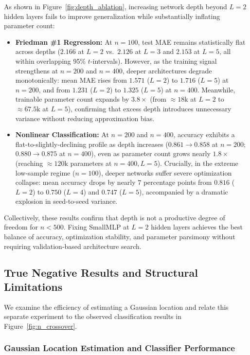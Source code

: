 \documentclass{article}
\begin{document}
As shown in Figure~\ref{fig:depth_ablation}, increasing network depth beyond $L=2$ hidden layers fails to improve generalization while substantially inflating parameter count:
\begin{itemize}
    \item \textbf{Friedman \#1 Regression:} At $n=100$, test MAE remains statistically flat across depths ($2.166$ at $L=2$ vs.\ $2.126$ at $L=3$ and $2.153$ at $L=5$, all within overlapping 95\% $t$-intervals). However, as the training signal strengthens at $n=200$ and $n=400$, deeper architectures degrade monotonically: mean MAE rises from $1.571$ ($L=2$) to $1.716$ ($L=5$) at $n=200$, and from $1.231$ ($L=2$) to $1.325$ ($L=5$) at $n=400$. Meanwhile, trainable parameter count expands by $3.8\times$ (from $\approx 18\text{k}$ at $L=2$ to $\approx 67.5\text{k}$ at $L=5$), confirming that excess depth introduces unnecessary variance without reducing approximation bias.
    \item \textbf{Nonlinear Classification:} At $n=200$ and $n=400$, accuracy exhibits a flat-to-slightly-declining profile as depth increases ($0.861 \to 0.858$ at $n=200$; $0.880 \to 0.875$ at $n=400$), even as parameter count grows nearly $1.8\times$ (reaching $\approx 120\text{k}$ parameters at $n=400, L=5$). Crucially, in the extreme low-sample regime ($n=100$), deeper networks suffer severe optimization collapse: mean accuracy drops by nearly $7$ percentage points from $0.816$ ($L=2$) to $0.750$ ($L=4$) and $0.747$ ($L=5$), accompanied by a dramatic explosion in seed-to-seed variance.
\end{itemize}
Collectively, these results confirm that depth is not a productive degree of freedom for $n < 500$. Fixing SmallMLP at $L=2$ hidden layers achieves the best balance of accuracy, optimization stability, and parameter parsimony without requiring validation-based architecture search.

\subsection{True Negative Results and Structural Limitations}
\label{sec:negative_results}

We examine the efficiency of estimating a Gaussian location and relate this separate experiment to the observed classification results in Figure~\ref{fig:n_crossover}.

\subsubsection{Gaussian Location Estimation and Classifier Performance}
\label{sec:gaussian_penalty}
\end{document}
